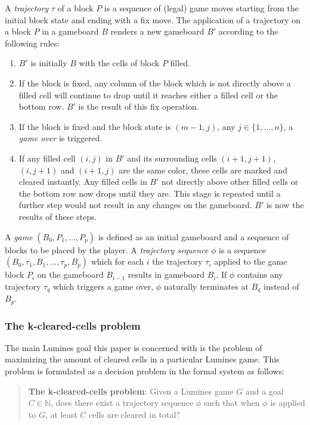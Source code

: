 \begin{description}[style=unboxed, leftmargin=0cm,labelsep=1em]
\item[Playing the game] A \textit{trajectory} $\tau$ of a block $P$ is a sequence of (legal) game moves starting from the initial block state and ending with a fix move. The application of a trajectory on a block $P$ in a gameboard $B$ renders a new gameboard $B'$ according to the following rules:

    \begin{enumerate}
            \item $B'$ is initially $B$ with the cells of block $P$ filled.
            \item If the block is fixed, any column of the block which is not directly above a filled cell will continue to drop until it reaches either a filled cell or the bottom row. $B'$ is the result of this fix operation.
            \item If the block is fixed and the block state is $(m-1, j)$, any $j \in \{1, \ldots, n\}$, a \textit{game over} is triggered.
            \item If any filled cell $(i,j)$ in $B'$ and its surrounding cells $(i+1,j+1)$, $(i, j+1)$ and $(i+1, j)$ are the same color, these cells are marked and cleared instantly. Any filled cells in $B'$ not directly above other filled cells or the bottom row now drops until they are. This stage is repeated until a further step would not result in any changes on the gameboard. $B'$ is now the results of these steps.
    \end{enumerate}

    A \textit{game} $(B_0, P_1, \ldots, P_p)$ is defined as an initial gameboard and a sequence of blocks to be placed by the player. A \textit{trajectory sequence} $\phi$ is a sequence $(B_0, \tau_1, B_1, \ldots ,\tau_p, B_p)$ which for each $i$ the trajectory $\tau_i$ applied to the game block $P_i$ on the gameboard $B_{i-1}$ results in gameboard $B_i$. If $\phi$ contains any trajectory $\tau_q$ which triggers a game over, $\phi$ naturally terminates at $B_q$ instead of $B_p$.
    \end{description}

\subsubsection{The k-cleared-cells problem}
The main Lumines goal this paper is concerned with is the problem of maximizing the amount of cleared cells in a particular Lumines game. This problem is formulated as a decision problem in the formal system as follows:

\begin{quote}
    \textbf{The k-cleared-cells problem}: Given a Lumines game $G$ and a goal $C \in \mathbb{N}$, does there exist a trajectory sequence $\phi$ such that when $\phi$ is applied to $G$, at least $C$ cells are cleared in total?
\end{quote}

